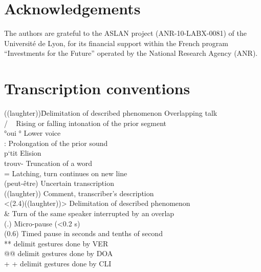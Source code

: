 \documentclass[output=paper]{langscibook}
\begin{document}
\section*{Acknowledgements}
The authors are grateful to the ASLAN project (ANR-10-LABX-0081) of the Université de Lyon, for its financial support within the French program “Investments for the Future” operated by the National Research Agency (ANR).

\section*{Transcription conventions}

\begin{tabbing}
((laughter))\hspace{1ex}\=Delimitation of described phenomenon\kill
[oui]    \>  Overlapping talk                                       \\
/   \    \>  Rising or falling intonation of the prior segment    \\
°oui °   \>  Lower voice                                        \\
:        \>  Prolongation of the prior sound                       \\
p`tit    \>  Elision                                                \\
trouv-   \>  Truncation of a word                                   \\
=        \>  Latching, turn continues on new line                  \\
(peut-être)   \>  Uncertain transcription                        \\
((laughter))  \>  Comment, transcriber's description             \\
<(2.4)((laughter))> \hspace{.5ex} Delimitation of described phenomenon       \\
\&       \>  Turn of the same speaker interrupted by an overlap     \\
(.)      \>  Micro-pause (<0.2 s)                                 \\
(0.6)    \>  Timed pause in seconds and tenths of second          \\
**       \>  delimit gestures done by VER                         \\ 
@@       \>   delimit gestures done by DOA                        \\
+ +      \> delimit gestures done by CLI                          \\

\end{tabbing}
\end{document}
